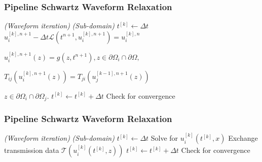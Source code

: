 \documentclass{beamer}
\begin{document}
\begin{frame}
  \frametitle{Pipeline Schwartz Waveform Relaxation}

    \begin{algorithmic}
    \textit{ (Waveform iteration)}
       \textit{ (Sub-domain)}
        \State $t^{[k]} \gets \Delta t$
            \State $u_i^{[k],n+1} - \Delta t\mathcal{L}(t^{n+1},u_i^{[k],n+1}) = u_i^{[k],n}$

            \State $u_i^{[k],n+1}(z) = g(z,t^{n+1}), 
                z \in \partial\Omega_i\cap\partial\Omega,$

            \State ${T}_{ij}(u_i^{[k],n+1}(z)) = 
                {T}_{ji}(u_j^{[k-1],n+1}(z))$

            \State  $z \in \partial\Omega_i\cap\partial\Omega_j.$
            \State  $t^{[k]} \gets t^{[k]}+\Delta t$
          \EndIf
        \EndWhile
      \State Check for convergence          
      \EndParFor
    \EndParFor
  \end{algorithmic}

\end{frame}


\begin{frame}
  \frametitle{Pipeline Schwartz Waveform Relaxation}

    \begin{algorithmic}
    \textit{ (Waveform iteration)}
       \textit{ (Sub-domain)}
        \State $t^{[k]} \gets \Delta t$
            \State Solve for $u_i^{[k]}(t^{[k]},x)$
            \State Exchange transmission data $\mathcal{T}(u_i^{[k]}(t^{[k]}, z))$
            \State $t^{[k]} \gets t^{[k]} + \Delta t$
          \EndIf
        \EndWhile
      \State Check for convergence          
      \EndParFor
    \EndFor
  \end{algorithmic}

\end{frame}
\end{document}
